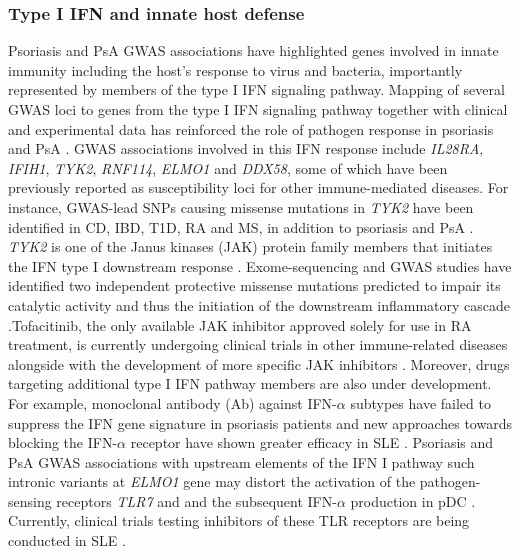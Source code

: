 \subsubsection*{Type I IFN and innate host defense}
Psoriasis and PsA GWAS associations have highlighted genes involved in innate immunity including the host’s response to virus and bacteria, importantly represented by members of the type I IFN signaling pathway. Mapping of several GWAS loci to genes from the type I IFN signaling pathway together with clinical and experimental data has reinforced the role of pathogen response in psoriasis and PsA \parencite{Nextle2005}. GWAS associations involved in this IFN response include \textit{IL28RA}, \textit{IFIH1}, \textit{TYK2}, \textit{RNF114}, \textit{ELMO1} and \textit{DDX58}, some of which have been previously reported as susceptibility loci for other immune-mediated diseases. For instance, GWAS-lead SNPs causing missense mutations in \textit{TYK2} have been identified in CD, IBD, T1D, RA and MS, in addition to psoriasis and PsA \parencite{ImmunoBase}. \textit{TYK2} is one of the Janus kinases (JAK) protein family members that initiates the IFN type I downstream response \parencite{Calamonici1994}. Exome-sequencing and GWAS studies have identified two independent protective missense mutations predicted to impair its catalytic activity and thus the initiation of the downstream inflammatory cascade \parencite{Strange2010, Tsoi2012, Dand2017}.Tofacitinib, the only available JAK inhibitor approved solely for use in RA treatment, is currently undergoing clinical trials in other immune-related diseases alongside with the development of more specific JAK inhibitors \parencite{Baker2017}. Moreover, drugs targeting additional type I IFN pathway members are also under development. For example, monoclonal antibody (Ab) against IFN-$\alpha$ subtypes have failed to suppress the IFN gene signature in psoriasis patients and new approaches towards blocking the IFN-$\alpha$ receptor have shown greater efficacy in SLE \parencite{Furie2017}. Psoriasis and PsA GWAS associations with upstream elements of the IFN I pathway such intronic variants at \textit{ELMO1} gene may distort the activation of the pathogen-sensing receptors \textit{TLR7} and \parencite{TLR9} and the subsequent IFN-$\alpha$ production in pDC \parencite{Tsoi2012}. Currently, clinical trials testing inhibitors of these TLR receptors are being conducted in SLE \parencite{Baker2017}.



